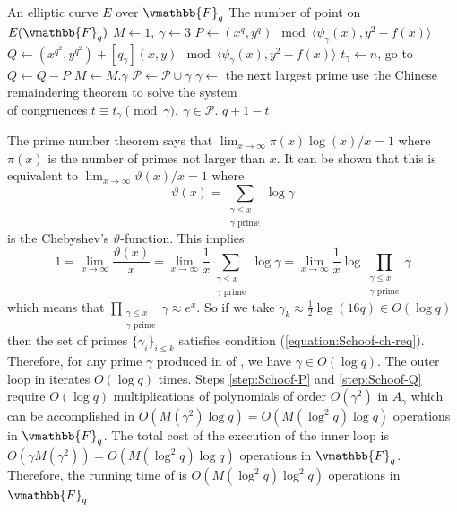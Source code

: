 \begin{algorithm}
\label{algorithm:count-Schoof}
\begin{algorithmic}[1]
\REQUIRE An elliptic curve $E$ over $\vmathbb{F}_q$
\ENSURE  The number of point on $E(\vmathbb{F}_q)$
\STATE $M \leftarrow 1$, $\gamma \leftarrow 3$
	\STATE $P \leftarrow (x^q, y^q) \mod {\langle \psi_\gamma(x), y^2 - f(x) \rangle}$
	\label{step:Schoof-P}
	\STATE $Q \leftarrow (x^{q^2}, y^{q^2}) + [q_\gamma](x, y) \mod {\langle \psi_\gamma(x), y^2 - 
f(x) \rangle}$
	\label{step:Schoof-Q}
			\STATE $t_\gamma \leftarrow n$, go to 
		\ELSE 
			\STATE $Q \leftarrow Q - P$
		\ENDIF
	\ENDFOR
	\STATE $M \leftarrow M.\gamma$
	\label{step:Schoof-M}
	\STATE $\mathcal{P} \leftarrow \mathcal{P} \cup \gamma$
	\STATE $\gamma \leftarrow$ the next largest prime
	\label{step:Schoof-gamma}	
\ENDWHILE
\STATE use the Chinese remaindering theorem to solve the system \\ of congruences $t \equiv t_\gamma 
\pmod \gamma, \: \gamma \in \mathcal{P}$.
\RETURN $q + 1 - t$ 
\end{algorithmic}
\end{algorithm}

The prime number theorem says that $\lim_{x \rightarrow \infty} \pi(x)\log(x) / x = 1$ where 
$\pi(x)$ is the number of primes not larger than $x$. It can be shown that this is equivalent to 
$\lim_{x \rightarrow \infty} \vartheta(x) / x = 1$ where 
$$
\vartheta(x) = \sum_{\substack{\gamma \le x \\ \gamma \text{ prime}}} \log \gamma
$$
is the Chebyshev's $\vartheta$-function. This implies
$$
1 = \lim_{x \rightarrow \infty} \frac{\vartheta(x)}{x} = \lim_{x \rightarrow \infty} \frac{1}{x} 
\sum_{\substack{\gamma \le x \\ \gamma \text{ prime}}} \log \gamma = \lim_{x \rightarrow \infty} 
\frac{1}{x} \log \prod_{\substack{\gamma \le x \\ \gamma \text{ prime}}} \gamma
$$
which means that $\prod_{\substack{\gamma \le x \\ \gamma \text{ prime}}} \gamma \approx e^x$. So if 
we take $\gamma_k \approx \frac{1}{2}\log(16q) \in O(\log q)$ then the set of primes $\{ \gamma_i 
\}_{i \le k}$ satisfies condition (\ref{equation:Schoof-ch-req}). Therefore, for any prime $\gamma$ 
produced in  of , we have $\gamma 
\in O(\log q)$. The outer loop in  iterates $O(\log q)$ times. 
Steps \ref{step:Schoof-P} and \ref{step:Schoof-Q} require $O(\log q)$ multiplications of polynomials 
of order $O(\gamma^2)$ in $A_\gamma$ which can be accomplished in $O(M(\gamma^2)\log q) = O(M(\log^2 
q)\log q)$ operations in $\vmathbb{F}_q$. The total cost of the execution of the inner loop is 
$O(\gamma M(\gamma^2)) = O(M(\log^2 q)\log q)$ operations in $\vmathbb{F}_q$. Therefore, the running 
time of  is $O(M(\log^2 q)\log^2 q)$ operations in 
$\vmathbb{F}_q$.

